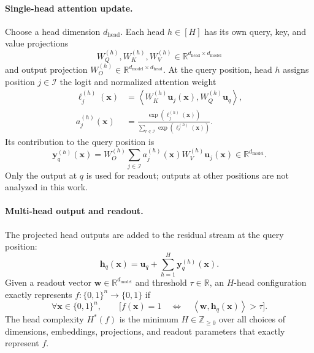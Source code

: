 \documentclass{article}
\theoremstyle{definition}
\theoremstyle{plain}
\newcommand{\hstar}{H^{\ast}}
\newcommand{\bits}{\{0,1\}}
\begin{document}
\paragraph{Single-head attention update.}
Choose a head dimension $d_{\mathrm{head}}$. Each head $h\in[H]$ has its own query, key, and value projections
\begin{equation}
W_Q^{(h)},W_K^{(h)},W_V^{(h)}
\in\mathbb{R}^{d_{\mathrm{head}}\times d_{\mathrm{model}}}
\end{equation}
and output projection $W_O^{(h)}\in\mathbb{R}^{d_{\mathrm{model}}\times d_{\mathrm{head}}}$. At the query position, head $h$ assigns position $j\in\mathcal I$ the logit and normalized attention weight
\begin{align}
\ell_j^{(h)}(\mathbf{x})
&=\left\langle W_K^{(h)}\mathbf{u}_j(\mathbf{x}),
W_Q^{(h)}\mathbf{u}_q\right\rangle,
\label{eq:app-attention-logit}\\
a_j^{(h)}(\mathbf{x})
&=\frac{\exp\!\left(\ell_j^{(h)}(\mathbf{x})\right)}
{\sum_{r\in\mathcal I}\exp\!\left(\ell_r^{(h)}(\mathbf{x})\right)}.
\label{eq:app-attention-weight}
\end{align}
Its contribution to the query position is
\begin{equation}
\mathbf{y}_q^{(h)}(\mathbf{x})
=W_O^{(h)}\sum_{j\in\mathcal I}
a_j^{(h)}(\mathbf{x})W_V^{(h)}\mathbf{u}_j(\mathbf{x})
\in\mathbb{R}^{d_{\mathrm{model}}}.
\label{eq:app-head-output}
\end{equation}
Only the output at $q$ is used for readout; outputs at other positions are not analyzed in this work.

\paragraph{Multi-head output and readout.}
The projected head outputs are added to the residual stream at the query position:
\begin{equation}
\mathbf{h}_q(\mathbf{x})
=\mathbf{u}_q+\sum_{h=1}^{H}\mathbf{y}_q^{(h)}(\mathbf{x}).
\label{eq:app-multihead-output}
\end{equation}
Given a readout vector $\mathbf{w}\in\mathbb{R}^{d_{\mathrm{model}}}$ and threshold $\tau\in\mathbb{R}$, an $H$-head configuration exactly represents $f:\bits^n\to\bits$ if
\begin{equation}
\forall\mathbf{x}\in\bits^n,\qquad
\bigl[f(\mathbf{x})=1
\quad\Longleftrightarrow\quad
\left\langle\mathbf{w},\mathbf{h}_q(\mathbf{x})\right\rangle>\tau\bigr].
\label{eq:app-linear-readout}
\end{equation}
The head complexity $\hstar(f)$ is the minimum $H\in\mathbb{Z}_{\geq0}$ over all choices of dimensions, embeddings, projections, and readout parameters that exactly represent $f$.
\end{document}
